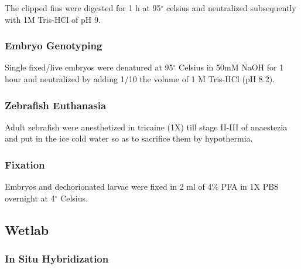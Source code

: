 \documentclass[11pt,singlespacinge,twoside]{reedthesis} %
\begin{document}
The clipped fins were digested for 1 h at 95\(^\circ\) celsius and neutralized subsequently with 1M Tris-HCl of pH 9.

\hypertarget{embryo-genotyping}{%
\subsubsection{Embryo Genotyping}\label{embryo-genotyping}}

Single fixed/live embryos were denatured at 95\(^\circ\) Celsius in 50mM NaOH for 1 hour and neutralized by adding 1/10 the volume of 1 M Tris-HCl (pH 8.2).

\hypertarget{zebrafish-euthanasia}{%
\subsubsection{Zebrafish Euthanasia}\label{zebrafish-euthanasia}}

Adult zebrafish were anesthetized in tricaine (1X) till stage II-III of anaestezia and put in the ice cold water so as to sacrifice them by hypothermia.

\hypertarget{fixation}{%
\subsubsection{Fixation}\label{fixation}}

Embryos and dechorionated larvae were fixed in 2 ml of 4\(\%\) PFA in 1X PBS overnight at 4\(^\circ\) Celsius.

\hypertarget{Wet-met}{%
\subsection{Wetlab}\label{Wet-met}}

\hypertarget{ISH-met}{%
\subsubsection{In Situ Hybridization}\label{ISH-met}}
\end{document}
